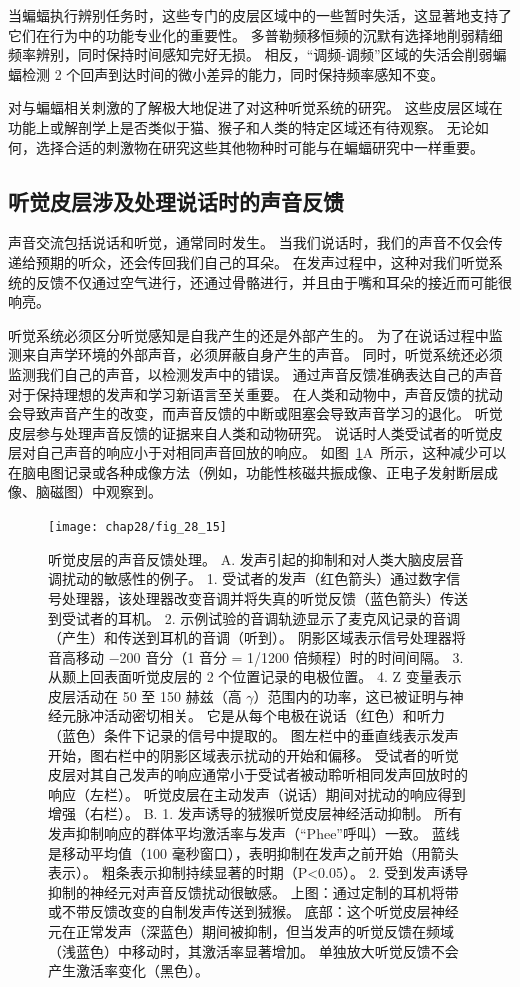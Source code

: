 当蝙蝠执行辨别任务时，这些专门的皮层区域中的一些暂时失活，这显著地支持了它们在行为中的功能专业化的重要性。
多普勒频移恒频的沉默有选择地削弱精细频率辨别，同时保持时间感知完好无损。
相反，“调频-调频”区域的失活会削弱蝙蝠检测 2 个回声到达时间的微小差异的能力，同时保持频率感知不变。


对与蝙蝠相关刺激的了解极大地促进了对这种听觉系统的研究。
这些皮层区域在功能上或解剖学上是否类似于猫、猴子和人类的特定区域还有待观察。
无论如何，选择合适的刺激物在研究这些其他物种时可能与在蝙蝠研究中一样重要。



\subsection{听觉皮层涉及处理说话时的声音反馈}

声音交流包括说话和听觉，通常同时发生。
当我们说话时，我们的声音不仅会传递给预期的听众，还会传回我们自己的耳朵。
在发声过程中，这种对我们听觉系统的反馈不仅通过空气进行，还通过骨骼进行，并且由于嘴和耳朵的接近而可能很响亮。


听觉系统必须区分听觉感知是自我产生的还是外部产生的。
为了在说话过程中监测来自声学环境的外部声音，必须屏蔽自身产生的声音。
同时，听觉系统还必须监测我们自己的声音，以检测发声中的错误。
通过声音反馈准确表达自己的声音对于保持理想的发声和学习新语言至关重要。
在人类和动物中，声音反馈的扰动会导致声音产生的改变，而声音反馈的中断或阻塞会导致声音学习的退化。
听觉皮层参与处理声音反馈的证据来自人类和动物研究。
说话时人类受试者的听觉皮层对自己声音的响应小于对相同声音回放的响应。
如图~\ref{fig:28_15}A~所示，这种减少可以在脑电图记录或各种成像方法（例如，功能性核磁共振成像、正电子发射断层成像、脑磁图）中观察到。


\begin{figure}[htbp]
	\centering
	\texttt{[image: chap28/fig\_28\_15]}
	\caption{听觉皮层的声音反馈处理。
		A. 发声引起的抑制和对人类大脑皮层音调扰动的敏感性的例子。
	1. 受试者的发声（红色箭头）通过数字信号处理器，该处理器改变音调并将失真的听觉反馈（蓝色箭头）传送到受试者的耳机。 
	2. 示例试验的音调轨迹显示了麦克风记录的音调（产生）和传送到耳机的音调（听到）。
	阴影区域表示信号处理器将音高移动 −200 音分（1 音分 = 1/1200 倍频程）时的时间间隔。
	3. 从颞上回表面听觉皮层的 2 个位置记录的电极位置。
	4. Z 变量表示皮层活动在 50 至 150 赫兹（高 $\gamma$）范围内的功率，这已被证明与神经元脉冲活动密切相关。 
	它是从每个电极在说话（红色）和听力（蓝色）条件下记录的信号中提取的。
	图左栏中的垂直线表示发声开始，图右栏中的阴影区域表示扰动的开始和偏移。
	受试者的听觉皮层对其自己发声的响应通常小于受试者被动聆听相同发声回放时的响应（左栏）。 
	听觉皮层在主动发声（说话）期间对扰动的响应得到增强（右栏）\cite{houde2015cortical}。
	B. 1. 发声诱导的狨猴听觉皮层神经活动抑制。 
	所有发声抑制响应的群体平均激活率与发声（“Phee”呼叫）一致。 
	蓝线是移动平均值（100 毫秒窗口），表明抑制在发声之前开始（用箭头表示）。 
	粗条表示抑制持续显著的时期（P<0.05）\cite{eliades2003sensory}。
	2. 受到发声诱导抑制的神经元对声音反馈扰动很敏感。
	上图：通过定制的耳机将带或不带反馈改变的自制发声传送到狨猴。
	底部：这个听觉皮层神经元在正常发声（深蓝色）期间被抑制，但当发声的听觉反馈在频域（浅蓝色）中移动时，其激活率显著增加。
	单独放大听觉反馈不会产生激活率变化（黑色）\cite{eliades2008neural}。}
	\label{fig:28_15}
\end{figure}


